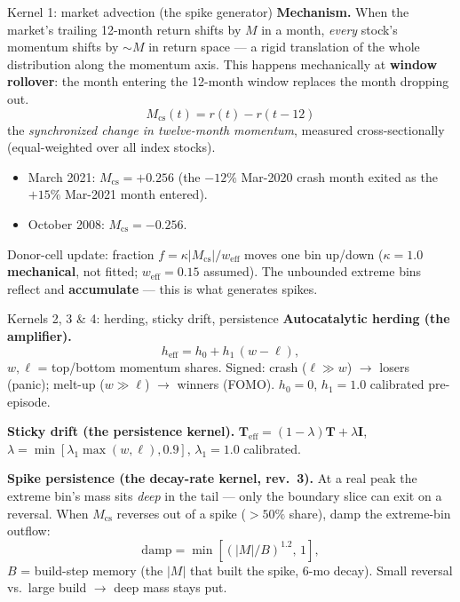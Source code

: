 \documentclass[10pt]{beamer}
\begin{document}
\begin{frame}{Kernel 1: market advection (the spike generator)}
  \small
  \textbf{Mechanism.} When the market's trailing 12-month return shifts by
  $M$ in a month, \emph{every} stock's momentum shifts by $\sim\!M$ in return
  space --- a rigid translation of the whole distribution along the momentum
  axis.  This happens mechanically at \textbf{window rollover}: the month
  entering the 12-month window replaces the month dropping out.
  \begin{equation*}
    M_{\mathrm{cs}}(t) = r(t) - r(t-12)
  \end{equation*}
  the \emph{synchronized change in twelve-month momentum}, measured
  cross-sectionally (equal-weighted over all index stocks).
  \begin{itemize}
    \item March 2021: $M_{\mathrm{cs}} = +0.256$ (the $-12\%$ Mar-2020 crash
      month exited as the $+15\%$ Mar-2021 month entered).
    \item October 2008: $M_{\mathrm{cs}} = -0.256$.
  \end{itemize}
  Donor-cell update: fraction $f = \kappa|M_{\mathrm{cs}}|/w_{\mathrm{eff}}$
  moves one bin up/down ($\kappa = 1.0$ \textbf{mechanical}, not fitted;
  $w_{\mathrm{eff}} = 0.15$ assumed).  The unbounded extreme bins reflect and
  \textbf{accumulate} --- this is what generates spikes.
\end{frame}

\begin{frame}{Kernels 2, 3 \& 4: herding, sticky drift, persistence}
  \small
  \textbf{Autocatalytic herding (the amplifier).}
  \begin{equation*}
    h_{\mathrm{eff}} = h_0 + h_1\,(w - \ell),
  \end{equation*}
  $w,\ell$ = top/bottom momentum shares.  Signed: crash ($\ell \gg w$)
  $\to$ losers (panic); melt-up ($w \gg \ell$) $\to$ winners (FOMO).
  $h_0 = 0$, $h_1 = 1.0$ calibrated pre-episode.
  \vspace{0.4em}

  \textbf{Sticky drift (the persistence kernel).}
  $\mathbf{T}_{\mathrm{eff}} = (1-\lambda)\mathbf{T} + \lambda\mathbf{I}$,
  $\lambda = \min[\lambda_1\max(w,\ell), 0.9]$, $\lambda_1 = 1.0$ calibrated.

  \vspace{0.4em}
  \textbf{Spike persistence (the decay-rate kernel, rev.~3).} At a real
  peak the extreme bin's mass sits \emph{deep} in the tail --- only the
  boundary slice can exit on a reversal.  When $M_{\mathrm{cs}}$ reverses
  out of a spike ($>50\%$ share), damp the extreme-bin outflow:
  \begin{equation*}
    \mathrm{damp} = \min\!\left[\left(|M|/B\right)^{1.2},\,1\right],
  \end{equation*}
  $B$ = build-step memory (the $|M|$ that built the spike, 6-mo decay).
  Small reversal vs.\ large build $\to$ deep mass stays put.
\end{frame}
\end{document}
